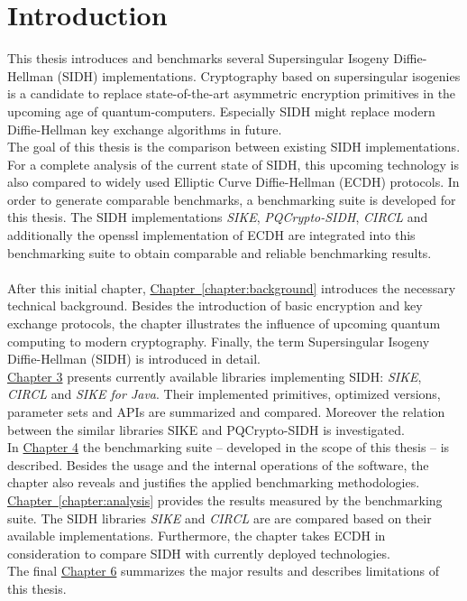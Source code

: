 \chapter{Introduction}\label{chapter:introduction}

This thesis introduces and benchmarks several Supersingular Isogeny Diffie-Hellman (\gls{SIDH}) implementations. Cryptography based on supersingular isogenies is a candidate to replace state-of-the-art asymmetric encryption primitives in the upcoming age of quantum-computers. Especially \gls{SIDH} might replace modern Diffie-Hellman key exchange algorithms in future.\\
The goal of this thesis is the comparison between existing \gls{SIDH} implementations. For a complete analysis of the current state of \gls{SIDH}, this upcoming technology is also compared to widely used Elliptic Curve Diffie-Hellman (\gls{ECDH}) protocols.
In order to generate comparable benchmarks, a benchmarking suite is developed for this thesis. The \gls{SIDH} implementations \textit{\gls{SIKE}}, \textit{\gls{PQCrypto-SIDH}}, \textit{\gls{CIRCL}} and additionally the \gls{openssl} implementation of ECDH are integrated into this benchmarking suite to obtain comparable and reliable benchmarking results.
\\\\
After this initial chapter, \hyperref[chapter:background]{Chapter~\ref*{chapter:background}} introduces the necessary technical background. Besides the introduction of basic encryption and key exchange protocols, the chapter illustrates the influence of upcoming quantum computing to modern cryptography. Finally, the term Supersingular Isogeny Diffie-Hellman (\gls{SIDH}) is introduced in detail.\\
\hyperref[chapter:existing_sidh]{Chapter 3} presents currently available libraries implementing \gls{SIDH}: \textit{\gls{SIKE}}, \textit{\gls{CIRCL}} and \textit{SIKE for Java}. Their implemented primitives, optimized versions, parameter sets and APIs are summarized and compared. Moreover the relation between the similar libraries \gls{SIKE} and \gls{PQCrypto-SIDH} is investigated. \\
In \hyperref[chapter:benchmarking_suite]{Chapter 4} the benchmarking suite -- developed in the scope of this thesis -- is described. Besides the usage and the internal operations of the software, the chapter also reveals and justifies the applied benchmarking methodologies.\\
\hyperref[chapter:analysis]{Chapter~\ref*{chapter:analysis}} provides the results measured by the benchmarking suite. The \gls{SIDH} libraries \textit{\gls{SIKE}} and \textit{\gls{CIRCL}} are are compared based on their available implementations. Furthermore, the chapter takes \gls{ECDH} in consideration to compare \gls{SIDH} with currently deployed technologies.\\
The final \hyperref[chapter:conclusion]{Chapter 6} summarizes the major results and describes limitations of this thesis.